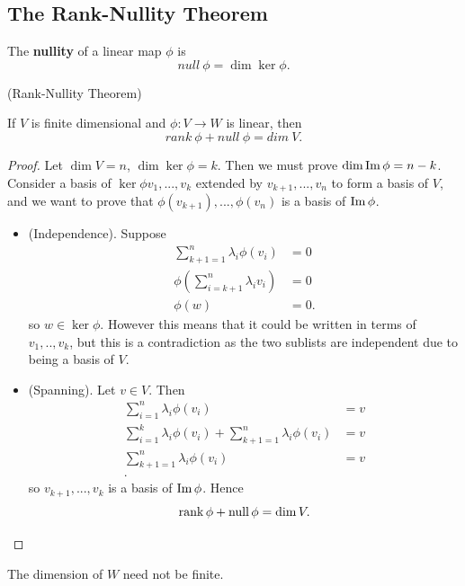 \subsection{The Rank-Nullity Theorem}

\begin{definition}
  The {\bf nullity} of a linear map $\phi$ is
    \[null \ \phi = \dim \ker \phi.\]
\end{definition}

\begin{theorem} (Rank-Nullity Theorem)

  If $V$ is finite dimensional and $\phi : V \rightarrow W$ is linear, then
  \[rank \ \phi + null \ \phi = dim \ V.\]
    
\end{theorem}
\begin{proof}
Let $\dim V = n$, $\dim \ker \phi = k$. Then we must prove $\dim \operatorname{Im} \phi = n - k$. Consider a basis of $\ker \phi v_1,...,v_k$ extended by $v_{k+1},...,v_n$ to form a basis of $V$, and we want to prove that $\phi(v_{k+1}), ..., \phi(v_n)$ is a basis of $\operatorname{Im} \phi$.
  \begin{itemize}
    \item (Independence). Suppose 
      \begin{align*}
        \sum_{ k+1 = 1}^{n} \lambda_i \phi(v_i) &= 0 \\
        \phi \left( \sum_{ i = k+1}^{n} \lambda_i v_i \right) &= 0 \\
        \phi(w) &= 0
      .\end{align*}
      so $w \in \ker \phi$. However this means that it could be written in terms of $v_1,..,v_k$, but this is a contradiction as the two sublists are independent due to being a basis of $V$.
    \item (Spanning). Let $v \in V$. Then
      \begin{align*}
        \sum_{ i = 1}^{n} \lambda_i \phi(v_i) &= v \\
        \sum_{ i = 1}^{k} \lambda_i \phi(v_i) + \sum_{ k+1 = 1}^{n} \lambda_i \phi(v_i) &= v \\
        \sum_{ k+1 = 1}^{n} \lambda_i \phi(v_i) &= v \\
      .\end{align*}
      so $v_{k+1},...,v_k$ is a basis of $\operatorname{Im} \phi$. Hence
      \[\operatorname{rank} \phi + \operatorname{null} \phi = \dim V.\]
  \end{itemize}
\end{proof}

\begin{remark}
    The dimension of $W$ need not be finite.
\end{remark}


